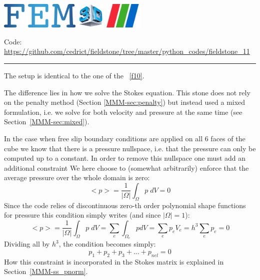 \includegraphics[height=1.25cm]{images/pictograms/FEM}
\includegraphics[height=1.25cm]{images/pictograms/3d}
\includegraphics[height=1.25cm]{images/pictograms/paraview}




\begin{center}
\inpython
{\small Code: \url{https://github.com/cedrict/fieldstone/tree/master/python_codes/fieldstone_11}}
\end{center}

\par\noindent\rule{\textwidth}{0.4pt}


The setup is identical to the one of the \stone~\ref{f10}.

The difference lies in how we solve the Stokes equation. This stone does not rely on 
the penalty method (Section \ref{MMM-sec:penalty}) 
but instead used a mixed formulation, i.e. we solve for both 
velocity and pressure at the same time (see Section~\ref{MMM-sec:mixed}).

In the case when free slip boundary conditions are applied on all 
6 faces of the cube we know that there is a pressure nullspace, i.e.
that the pressure can only be computed up to a constant. In order to 
remove this nullspace one must add an additional constraint 
We here choose to (somewhat arbitrarily) enforce that the average pressure 
over the whole domain is zero:
\[
<p>=\frac{1}{|\Omega|} \int_\Omega p \; dV =0 
\]
Since the code relies of discontinuous zero-th order polynomial shape functions 
for pressure this condition simply writes (and since $|\Omega|=1$):
\[
<p>=\frac{1}{|\Omega|} \int_\Omega p\;  dV 
=  \sum_{e} \int_{\Omega_e} p dV = \sum_e p_e V_e = h^3 \sum_e p_e =0
\]
Dividing all by $h^3$, the condition becomes simply:
\[
p_1 + p_2 + p_3 + ... + p_{nel} = 0
\]
How this constraint is incorporated in the Stokes matrix is explained in Section~\ref{MMM-ss_pnorm}.


